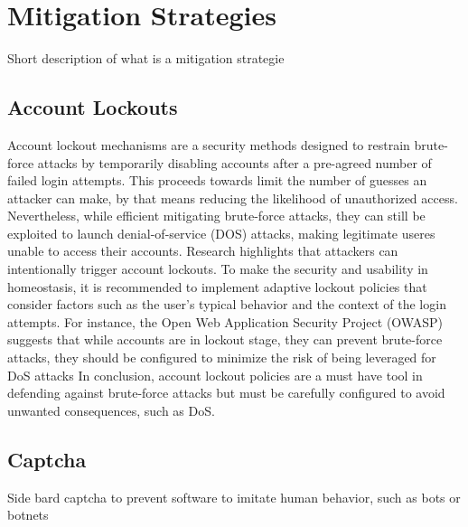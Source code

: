 \documentclass{comjnl}
\begin{document}
\section{Mitigation Strategies}

Short description of what is a mitigation strategie

\subsection{Account Lockouts}

Account lockout mechanisms are a security methods designed to restrain brute-force attacks by temporarily disabling accounts after a pre-agreed number of failed login attempts. This proceeds towards limit the number of guesses an attacker can make, by that means reducing the likelihood of unauthorized access. Nevertheless, while efficient mitigating brute-force attacks, they can still be exploited to launch denial-of-service (DOS) attacks, making legitimate useres unable to access their accounts. Research highlights that attackers can intentionally trigger account lockouts.\cite{account_lockout_dos} To make the security and usability in homeostasis, it is recommended to implement adaptive lockout policies that consider factors such as the user's typical behavior and the context of the login attempts. For instance, the Open Web Application Security Project (OWASP) suggests that while accounts are in lockout stage, they can prevent brute-force attacks, they should be configured to minimize the risk of being leveraged for DoS attacks \cite{blocking_brute_force} In conclusion, account lockout policies are a must have tool in defending against brute-force attacks but must be carefully configured to avoid unwanted consequences, such as DoS.
\subsection{Captcha}

Side bard captcha to prevent software to imitate human behavior, such as bots or botnets
\end{document}
